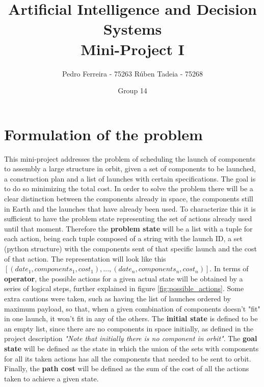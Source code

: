 \documentclass[11pt,a4paper,oneside]{article}
\title{\textbf{Artificial Intelligence and Decision Systems \\ Mini-Project I}}
\author{Pedro Ferreira - 75263 \hspace{1.5cm} Rúben Tadeia - 75268}
\date{Group 14}
\begin{document}
\maketitle

\vspace{-14mm}

\setcounter{section}{0}

\section{Formulation of the problem}

This mini-project addresses the problem of scheduling the launch of components to assembly a large structure in orbit, given a set of components to be launched, a construction plan and a list of launches with certain specifications. The goal is to do so minimizing the total cost. In order to solve the problem there will be a clear distinction between the components already in space, the components still in Earth and the launches that have already been used. To characterize this it is sufficient to have the problem state representing the set of actions already used until that moment. Therefore the \textbf{problem state} will be a list with a tuple for each action, being each tuple composed of a string with the launch ID, a set (python structure) with the components sent of that specific launch and the cost of that action. The representation will look like this $[ (date_1, {components_1}, cost_1), ..., (date_n, {components_n}, cost_n) ]$. In terms of \textbf{operator}, the possible actions for a given actual state will be obtained by a series of logical steps, further explained in figure \ref{fig:possible_actions}. Some extra cautions were taken, such as having the list of launches ordered by maximum payload, so that, when a given combination of components doesn't "fit" in one launch, it won't fit in any of the others. The \textbf{initial state} is defined to be an empty list, since there are no components in space initially, as defined in the project description \textit{"Note that initially there is no component in orbit"}. The \textbf{goal state} will be defined as the state in which the union of the sets with components for all its taken actions has all the components that needed to be sent to orbit. Finally, the \textbf{path cost} will be defined as the sum of the cost of all the actions taken to achieve a given state.
\end{document}
